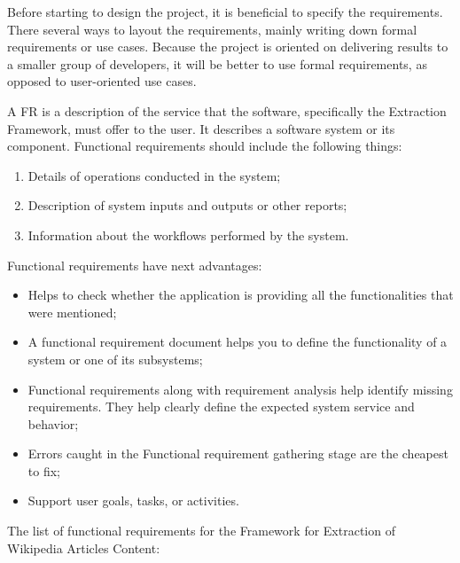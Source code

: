 \documentclass[thesis=M,english,hidelinks]{FITthesis}[2019/12/23]
\begin{document}
Before starting to design the project, it is beneficial to specify the requirements. There several ways to layout the requirements, mainly writing down formal requirements or use cases. Because the project is oriented on delivering results to a smaller group of developers, it will be better to use formal requirements, as opposed to user-oriented use cases.

A \gls{FR} is a description of the service that the software, specifically the Extraction Framework, must offer to the user. It describes a software system or its component.  Functional requirements should include the following things:
\begin{enumerate}
	\item Details of operations conducted in the system;
	\item Description of system inputs and outputs or other reports;
	\item Information about the workflows performed by the system.
\end{enumerate}

Functional requirements have next advantages:
\begin{itemize}
	\item Helps to check whether the application is providing all the functionalities that were mentioned;
	\item A functional requirement document helps you to define the functionality of a system or one of its subsystems;
	\item Functional requirements along with requirement analysis help identify missing requirements. They help clearly define the expected system service and behavior;
	\item Errors caught in the Functional requirement gathering stage are the cheapest to fix;
	\item Support user goals, tasks, or activities.
\end{itemize}

The list of functional requirements for the Framework for Extraction of Wikipedia Articles Content:
\end{document}
